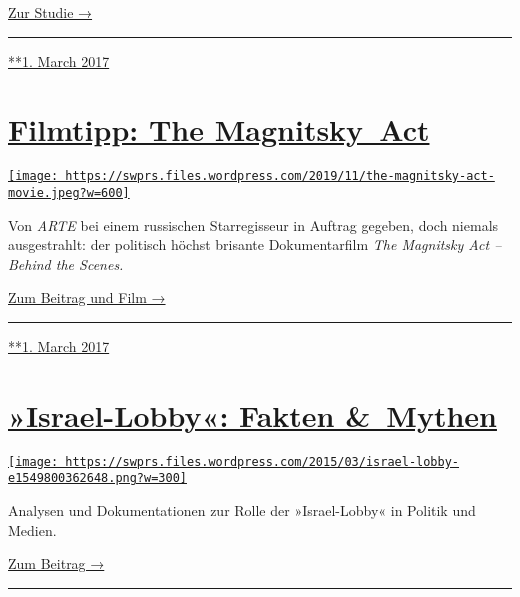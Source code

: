 \href{https://swprs.org/die-propaganda-matrix}{Zur Studie →}

\begin{center}\rule{0.5\linewidth}{\linethickness}\end{center}

\href{https://swprs.org/2017/03/01/propaganda-matrix/}{**1. March 2017}

\hypertarget{filmtipp-the-magnitsky-act}{%
\section{\texorpdfstring{\href{https://swprs.org/2017/03/01/magnitsky/}{Filmtipp:
The
Magnitsky~Act}}{Filmtipp: The Magnitsky~Act}}\label{filmtipp-the-magnitsky-act}}

\href{https://swprs.org/2017/03/01/magnitsky/}{\texttt{[image: https://swprs.files.wordpress.com/2019/11/the-magnitsky-act-movie.jpeg?w=600]}}

Von \emph{ARTE} bei einem russischen Star­re­gisseur in Auftrag gegeben,
doch niemals ausgestrahlt: der politisch höchst brisante
Doku­men­tar­film \emph{The Magnitsky Act -- Behind the Scenes.}

\href{https://swprs.org/der-fall-magnitsky/}{Zum Beitrag und Film →}

\begin{center}\rule{0.5\linewidth}{\linethickness}\end{center}

\href{https://swprs.org/2017/03/01/magnitsky/}{**1. March 2017}

\hypertarget{israel-lobby-fakten--mythen}{%
\section{\texorpdfstring{\href{https://swprs.org/2017/03/01/die-israel-lobby-fakten-und-mythen/}{»Israel-Lobby«:
Fakten
\&~Mythen}}{»Israel-Lobby«: Fakten \&~Mythen}}\label{israel-lobby-fakten--mythen}}

\href{https://swprs.org/2017/03/01/die-israel-lobby-fakten-und-mythen/}{\texttt{[image: https://swprs.files.wordpress.com/2015/03/israel-lobby-e1549800362648.png?w=300]}}

Analysen und Dokumentationen zur Rolle der »Israel-Lobby« in Politik und
Medien.

\href{https://swprs.org/die-israel-lobby-fakten-und-mythen/}{Zum Beitrag
→}

\begin{center}\rule{0.5\linewidth}{\linethickness}\end{center}

